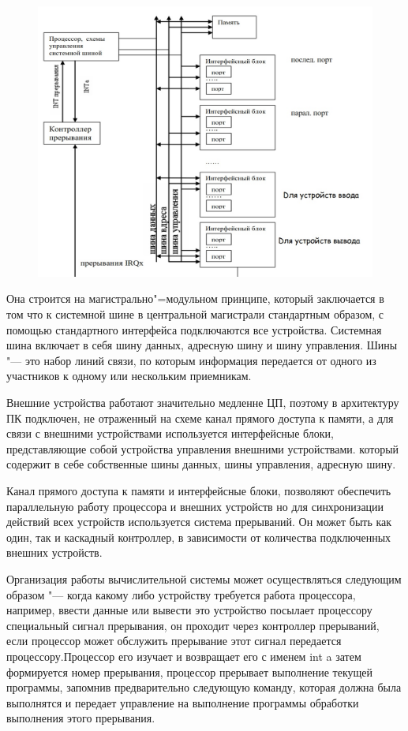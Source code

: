 \begin{figure}[H]
    \centering
    \includegraphics[scale = 0.4]{structurePC.jpg}
\end{figure}

Она строится на магистрально"=модульном принципе, который заключается в том что к системной шине в центральной магистрали стандартным образом, 
с помощью стандартного интерфейса подключаются все устройства.
Системная шина включает в себя шину данных, адресную шину и шину управления.
Шины "--- это набор линий связи, по которым информация передается от одного из участников к одному или нескольким приемникам.

Внешние устройства работают значительно медленне ЦП, поэтому в архитектуру ПК подключен, не отраженный на схеме канал прямого доступа к памяти, 
а для связи с внешними устройствами используется интерфейсные блоки, представляющие собой устройства управления внешними устройствами.
который содержит в себе собственные шины данных, шины управления, адресную шину.

Канал прямого доступа к памяти и интерфейсные блоки, позволяют обеспечить параллельную работу процессора и внешних устройств
но для синхронизации действий всех устройств используется система прерываний.
Он может быть как один, так и каскадный контроллер, в зависимости от количества подключенных внешних устройств.

Организация работы вычислительной системы может осуществляться следующим образом "---
когда какому либо устройству требуется работа процессора, например, ввести данные или вывести
это устройство посылает процессору специальный сигнал прерывания, он проходит через контроллер прерываний, если процессор может обслужить прерывание
этот сигнал передается процессору.Процессор его изучает и возвращает его с именем int a затем формируется номер прерывания, процессор прерывает выполнение текущей программы,
запомнив предварительно следующую команду, которая должна была выполнятся и передает управление на выполнение программы обработки выполнения этого прерывания.

